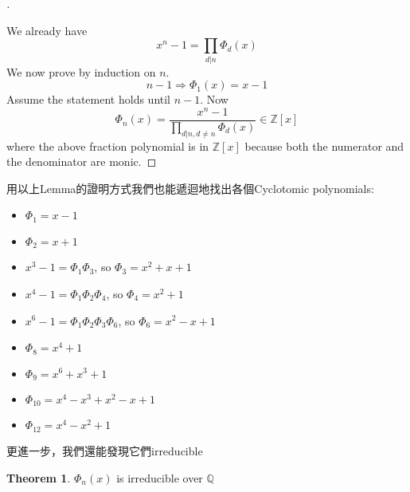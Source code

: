 \documentclass{article}
\theoremstyle{definition}
\newtheorem{thm}{Theorem}
\newenvironment{proofs}[1][\proofname]{%
  \begin{proof}[#1]$ $\par\nobreak\ignorespaces
}{%
  \end{proof}
}
\begin{document}
\begin{proofs}
	We already have
	\[
		x^n - 1 = \prod_{d | n} \Phi_d(x)
	\]
	We now prove by induction on $n$.
	\[
		n - 1 \Rightarrow \Phi_1(x) = x- 1
	\]
	Assume the statement holds until $n - 1$.
	Now
	\[
		\Phi_n(x) = \frac{x^n - 1}{\prod_{d|n, d \neq n} \Phi_d(x)} \in \mathbb{Z}[x]
	\]
	where the above fraction polynomial is in $\mathbb{Z}[x]$ because both the numerator and the denominator are monic.
\end{proofs}

用以上Lemma的證明方式我們也能遞迴地找出各個Cyclotomic polynomials:
\begin{itemize}
	\item $\Phi_1=x-1$
	\item $\Phi_2=x+1$
	\item $x^3-1=\Phi_1\Phi_3$, so $\Phi_3=x^2+x+1$
	\item $x^4-1=\Phi_1\Phi_2\Phi_4$, so $\Phi_4=x^2+1$
	\item $x^6-1=\Phi_1\Phi_2\Phi_3\Phi_6$, so $\Phi_6=x^2-x+1$
	\item $\Phi_8=x^4+1$
	\item $\Phi_9=x^6+x^3+1$
	\item $\Phi_{10}=x^4-x^3+x^2-x+1$
	\item $\Phi_{12}=x^4-x^2+1$
\end{itemize}

更進一步，我們還能發現它們irreducible

\begin{thm}
	$\Phi_n(x)$ is irreducible over $\mathbb{Q}$
\end{thm}
\end{document}
